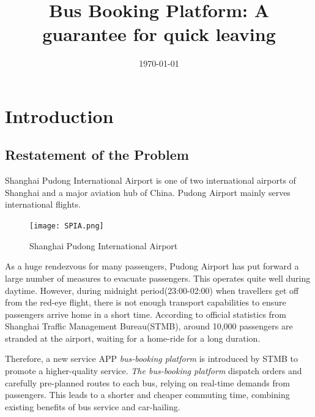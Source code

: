 \documentclass{mcmthesis}
\begin{document}
\linespread{0.6} %
\setlength{\parskip}{0.5\baselineskip} %
\title{Bus Booking Platform: A guarantee for quick leaving}

\date{\today}
	\begin{abstract}
	
		\begin{keywords}
		
		\end{keywords}
	\end{abstract}

\maketitle

\tableofcontents

\newpage

\section{Introduction}
\subsection{Restatement of the Problem}
Shanghai Pudong International Airport is one of two international airports of Shanghai and a major aviation hub of China. Pudong Airport mainly serves international flights.

\begin{figure}[h]
    \centering
    \texttt{[image: SPIA.png]}
    \caption{Shanghai Pudong International Airport \cite{Google_SPIA}}
    \label{fig:SPIA}
\end{figure}

As a huge rendezvous for many passengers, Pudong Airport has put forward a large number of measures to evacuate passengers. This operates quite well during daytime. However, during midnight period(23:00-02:00) when travellers get off from the red-eye flight, there is not enough transport capabilities to ensure passengers arrive home in a short time. According to official statistics from Shanghai Traffic Management Bureau(STMB), around 10,000 passengers are stranded at the airport, waiting for a home-ride for a long duration.

Therefore, a new service APP \emph{bus-booking platform} is introduced by STMB to promote a higher-quality service. \emph{The bus-booking platform} dispatch orders and carefully pre-planned routes to each bus, relying on real-time demands from passengers. This leads to a shorter and cheaper commuting time, combining existing benefits of bus service and car-hailing.
\end{document}
